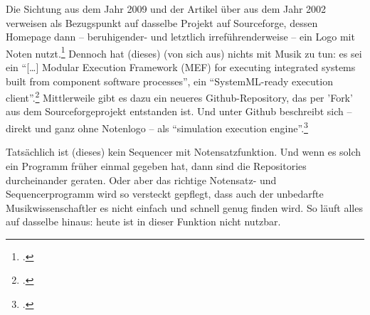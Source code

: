 Die Sichtung aus dem Jahr 2009 und der Artikel über  aus dem Jahr 2002 verweisen als Bezugspunkt auf dasselbe Projekt auf Sourceforge, dessen Homepage dann -- beruhigender- und letztlich irreführenderweise -- ein Logo mit Noten nutzt.\footcite[vgl.][\nopage
wp.]{Brahms2013a} Dennoch hat (dieses)  (von sich aus) nichts mit
Musik zu tun: es sei ein \enquote{[\ldots] Modular Execution Framework (MEF) for
executing integrated systems built from component software processes}, ein
\enquote{SystemML-ready execution client}.\footcite[vgl.][\nopage
wp.]{Brahms2013b} Mittlerweile gibt es dazu ein neueres Github-Repository, das
per 'Fork' aus dem Sourceforgeprojekt entstanden ist. Und unter Github
beschreibt sich  -- direkt und ganz ohne Notenlogo -- als
\enquote{simulation execution engine}.\footcite[vgl.][\nopage wp.]{Brahms2018a}

Tatsächlich ist (dieses)  kein Sequencer mit Notensatzfunktion. Und
wenn es solch ein Programm früher einmal gegeben hat, dann
sind die Repositories durcheinander geraten. Oder aber das richtige Notensatz-
und Sequencerprogramm  wird so versteckt gepflegt, dass auch der
unbedarfte Musikwissenschaftler es nicht einfach und schnell genug finden wird.
So läuft alles auf dasselbe hinaus: heute ist  in dieser Funktion
nicht nutzbar.


%
